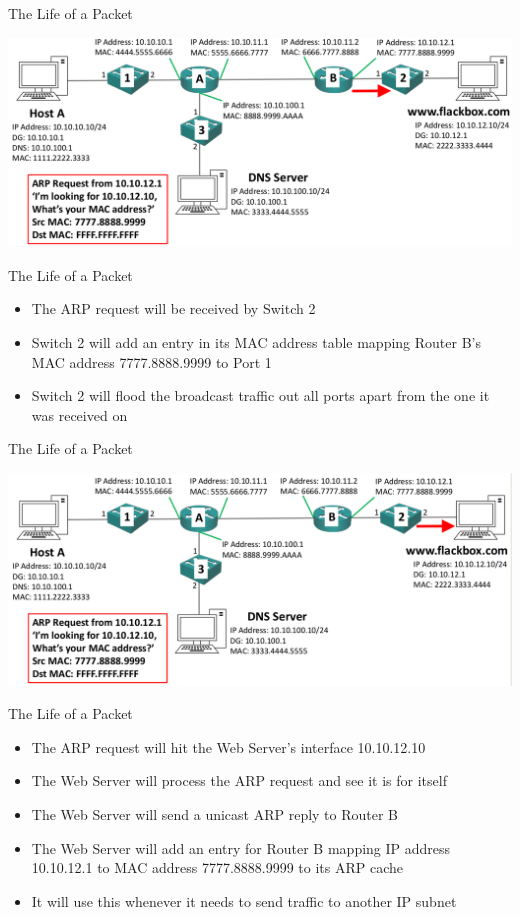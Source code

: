 \documentclass[pdflatex,compress,mathserif]{beamer}
\begin{document}
\begin{frame}{The Life of a Packet}
	\begin{center}
		\includegraphics[width=\linewidth]{img/img49}
	\end{center}
\end{frame}

\begin{frame}{The Life of a Packet}
	\begin{itemize}
		\item The ARP request will be received by Switch 2
		\item Switch 2 will add an entry in its MAC address table mapping Router B’s MAC address 7777.8888.9999 to Port 1
		\item Switch 2 will flood the broadcast traffic out all ports apart from the one it was received on
	\end{itemize}
\end{frame}

\begin{frame}{The Life of a Packet}
	\begin{center}
		\includegraphics[width=\linewidth]{img/img50}
	\end{center}
\end{frame}

\begin{frame}{The Life of a Packet}
	\begin{itemize}
		\item The ARP request will hit the Web Server’s interface 10.10.12.10
		\item The Web Server will process the ARP request and see it is for itself
		\item The Web Server will send a unicast ARP reply to Router B
		\item The Web Server will add an entry for Router B mapping IP address 10.10.12.1 to MAC address 7777.8888.9999 to its ARP cache
		\item It will use this whenever it needs to send traffic to another IP subnet
	\end{itemize}
\end{frame}
\end{document}
